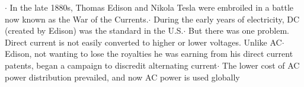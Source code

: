 \documentclass[preview]{standalone}
\begin{document}
\centering $\cdot$ In the late 1880s, Thomas Edison and Nikola Tesla were embroiled in a battle now known as the War of the Currents.\newline $\cdot$ During the early years of electricity, DC (created by Edison) was the standard in the U.S.\newline $\cdot$ But there was one problem. Direct current is not easily converted to higher or lower voltages. Unlike AC\newline $\cdot$ Edison, not wanting to lose the royalties he was earning from his direct current patents, began a campaign to discredit alternating current\newline $\cdot$ The lower cost of AC power distribution prevailed, and now AC power is used globally
\end{document}
